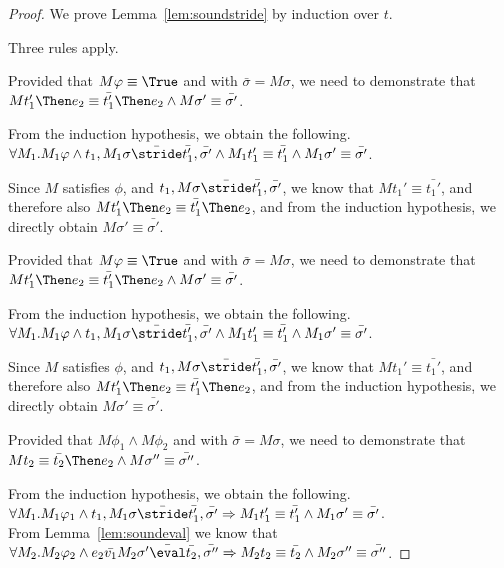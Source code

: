 \begin{proof}
  We prove Lemma~\ref{lem:soundstride} by induction over $t$.

  {
  Three rules apply.\\
    {Provided that $M\phi\equiv\True$ and  with $\bar{\sigma}=M\sigma$,
    we need to demonstrate that $M t_1'\Then e_2 \equiv \bar{t_1'}\Then e_2 \land M\sigma'\equiv \bar{\sigma'}$.

    From the induction hypothesis, we obtain the following.
    $\forall M_1 . M_1 \phi \land t_1,M_1\sigma \bar{\stride} \bar{t_1'},\bar{\sigma'}\land M_1 t_1'\equiv\bar{t_1'}\land M_1\sigma' \equiv \bar{\sigma'}$.

    Since $M$ satisfies $\phi$, and $t_1,M\sigma \bar{\stride} \bar{t_1'},\bar{\sigma'}$,
    we know that $M t_1'\equiv\bar{t_1'}$,
    and therefore also $M t_1'\Then e_2 \equiv \bar{t_1'}\Then e_2$,
    and from the induction hypothesis, we directly obtain  $M\sigma'\equiv \bar{\sigma'}$.
    }
    {Provided that $M\phi\equiv\True$ and  with $\bar{\sigma}=M\sigma$,
    we need to demonstrate that $M t_1'\Then e_2 \equiv \bar{t_1'}\Then e_2 \land M\sigma'\equiv \bar{\sigma'}$.

    From the induction hypothesis, we obtain the following.
    $\forall M_1 . M_1 \phi \land t_1,M_1\sigma \bar{\stride} \bar{t_1'},\bar{\sigma'}\land M_1 t_1'\equiv\bar{t_1'}\land M_1\sigma' \equiv \bar{\sigma'}$.

    Since $M$ satisfies $\phi$, and $t_1,M\sigma \bar{\stride} \bar{t_1'},\bar{\sigma'}$,
    we know that $M t_1'\equiv\bar{t_1'}$,
    and therefore also $M t_1'\Then e_2 \equiv \bar{t_1'}\Then e_2$,
    and from the induction hypothesis, we directly obtain  $M\sigma'\equiv \bar{\sigma'}$.
    }
    {Provided that $M\phi_1\land M\phi_2$ and  with $\bar{\sigma}=M\sigma$,
    we need to demonstrate that $M t_2 \equiv \bar{t_2}\Then e_2 \land M\sigma''\equiv \bar{\sigma''}$.

    From the induction hypothesis, we obtain the following.
    $\forall M_1 . M_1 \phi_1 \land t_1,M_1\sigma \bar{\stride} \bar{t_1'},\bar{\sigma'}\implies M_1 t_1'\equiv\bar{t_1'}\land M_1\sigma' \equiv \bar{\sigma'}$.\\
    From Lemma~\ref{lem:soundeval} we know that $\forall M_2 . M_2 \phi_2 \land e_2\bar{v_1}M_2\sigma'\bar{\eval}\bar{t_2},\bar{\sigma''}\implies M_2 t_2\equiv \bar{t_2}\land M_2\sigma''\equiv \bar{\sigma''}$.

}}
\end{proof}

